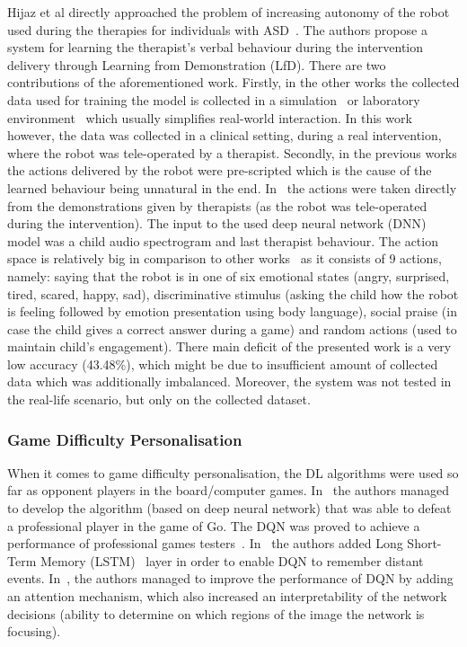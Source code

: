 \documentclass[thesis]{mas_proposal}
\begin{document}
Hijaz et al directly approached the problem of increasing autonomy of the robot used during the therapies for individuals with ASD~\cite{Hijaz2021}. The authors propose a system for learning the therapist's verbal behaviour during the intervention delivery through Learning from Demonstration (LfD). There are two contributions of the aforementioned work. Firstly, in the other works the collected data used for training the model is collected in a simulation~\cite{Turner2018,Belo2021,Belo2022} or laboratory environment~\cite{ClarkTurner2017,Turner2018,Romeo2018} which usually simplifies real-world interaction. In this work however, the data was collected in a clinical setting, during a real intervention, where the robot was tele-operated by a therapist. Secondly, in the previous works the actions delivered by the robot were pre-scripted which is the cause of the learned behaviour being unnatural in the end. In~\cite{Hijaz2021} the actions were taken directly from the demonstrations given by therapists (as the robot was tele-operated during the intervention). The input to the used deep neural network (DNN) model was a child audio spectrogram and last therapist behaviour. The action space is relatively big in comparison to other works~\cite{Qureshi2016,Qureshi2017,Qureshi2018,ClarkTurner2017,Turner2018,Belo2021,Belo2022,Romeo2018,Romeo2019} as it consists of 9 actions, namely: saying that the robot is in one of six emotional states (angry, surprised, tired, scared, happy, sad), discriminative stimulus (asking the child how the robot is feeling followed by emotion presentation using body language), social praise (in case the child gives a correct answer during a game) and random actions (used to maintain child's engagement). There main deficit of the presented work is a very low accuracy (43.48\%), which might be due to insufficient amount of collected data which was additionally imbalanced. Moreover, the system was not tested in the real-life scenario, but only on the collected dataset. 


\subsubsection{Game Difficulty Personalisation}
When it comes to game difficulty personalisation, the DL algorithms were used so far as opponent players in the board/computer games. In~\cite{Silver2016} the authors managed to develop the algorithm (based on deep neural network) that was able to defeat a professional player in the game of Go. The DQN was proved to achieve a performance of professional games testers~\cite{mnih2015human}. In~\cite{hausknecht2015deep} the authors added Long Short-Term Memory (LSTM)~\cite{hochreiter1997long} layer in order to enable DQN to remember distant events. In~\cite{sorokin2015deep}, the authors managed to improve the performance of DQN by adding an attention mechanism, which also increased an interpretability of the network decisions (ability to determine on which regions of the image the network is focusing). 
\end{document}
